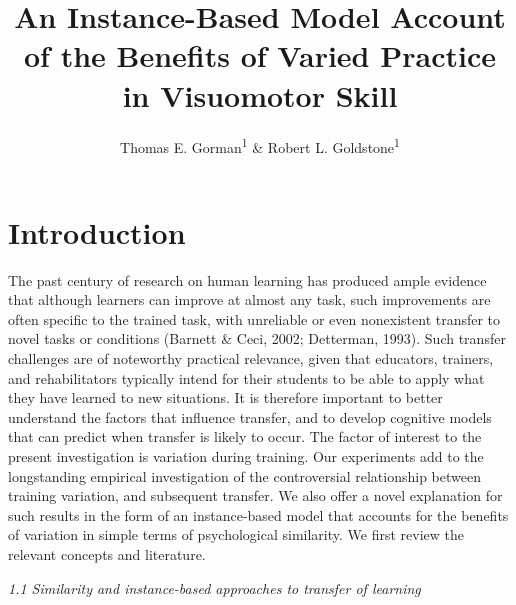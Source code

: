 \documentclass[
  jou, donotrepeattitle,floatsintext]{apa7}
\title{An Instance-Based Model Account of the Benefits of Varied Practice in Visuomotor Skill}
\author{Thomas E. Gorman\textsuperscript{1} \& Robert L. Goldstone\textsuperscript{1}}
\date{}
\affiliation{\vspace{0.5cm}\textsuperscript{1} Indiana University - Bloomington}
\begin{document}
\maketitle

\setcounter{secnumdepth}{5}

\hypertarget{introduction}{%
\section{Introduction}\label{introduction}}

The past century of research on human learning has produced ample evidence that although learners can improve at almost any task, such improvements are often specific to the trained task, with unreliable or even nonexistent transfer to novel tasks or conditions (Barnett \& Ceci, 2002; Detterman, 1993). Such transfer challenges are of noteworthy practical relevance, given that educators, trainers, and rehabilitators typically intend for their students to be able to apply what they have learned to new situations. It is therefore important to better understand the factors that influence transfer, and to develop cognitive models that can predict when transfer is likely to occur. The factor of interest to the present investigation is variation during training. Our experiments add to the longstanding empirical investigation of the controversial relationship between training variation, and subsequent transfer. We also offer a novel explanation for such results in the form of an instance-based model that accounts for the benefits of variation in simple terms of psychological similarity. We first review the relevant concepts and literature.

\emph{1.1 Similarity and instance-based approaches to transfer of learning}
\end{document}
